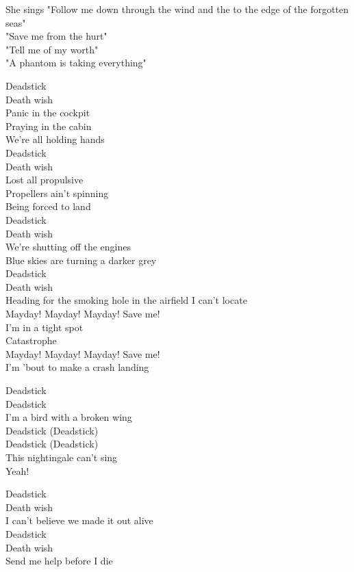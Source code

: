She sings "Follow me down through the wind and the  to the edge of the forgotten seas"\\
"Save me from the hurt"\\
"Tell me of my worth"\\
"A phantom is taking everything"\\


Deadstick\\
Death wish\\
Panic in the cockpit\\
Praying in the cabin\\
We're all holding hands\\
Deadstick\\
Death wish\\
Lost all propulsive\\
Propellers ain't spinning\\
Being forced to land\\
Deadstick\\
Death wish\\
We're shutting off the engines\\
Blue skies are turning a darker grey\\
Deadstick\\
Death wish\\
Heading for the smoking hole in the airfield I can't locate\\

Mayday! Mayday! Mayday! Save me!\\
I'm in a tight spot\\
Catastrophe\\
Mayday! Mayday! Mayday! Save me!\\
I'm 'bout to make a crash landing\\


Deadstick\\
Deadstick\\
I'm a bird with a broken wing\\
Deadstick (Deadstick)\\
Deadstick (Deadstick)\\
This nightingale can't sing\\
Yeah!\\


Deadstick\\
Death wish\\
I can't believe we made it out alive\\
Deadstick\\
Death wish\\
Send me help before I die\\

